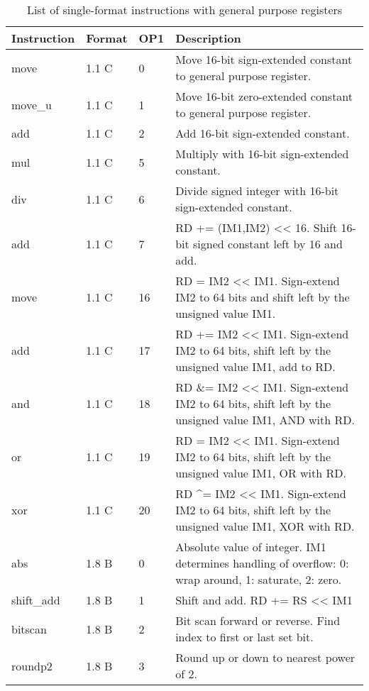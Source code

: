\documentclass[forwardcom.tex]{subfiles}
\begin{document}
\begin{longtable} {|p{25mm}|p{14mm}|p{10mm}|p{95mm}|}
\caption{List of single-format instructions with general purpose registers} 
\label{table:ListOfSingleFormatInstructionsGP} \\
\endfirsthead
\endhead
\hline
\bfseries Instruction & \bfseries Format &\bfseries OP1 & \bfseries Description \\
\hline
move          & 1.1 C &  0 & Move 16-bit sign-extended constant to general purpose register. \\
move\_u       & 1.1 C &  1 & Move 16-bit zero-extended constant to general purpose register. \\
add           & 1.1 C &  2  & Add 16-bit sign-extended constant. \\
mul           & 1.1 C &  5  & Multiply with 16-bit sign-extended constant. \\
div           & 1.1 C &  6  & Divide signed integer with 16-bit sign-extended constant. \\
add           & 1.1 C &  7  & RD += (IM1,IM2) \textless\textless{} 16. Shift 16-bit signed constant left by 16 and add. \\
move          & 1.1 C & 16  & RD = IM2 \textless\textless{} IM1. Sign-extend IM2 to 64 bits and shift left by the unsigned value IM1. \\
add           & 1.1 C & 17  & RD += IM2 \textless\textless{} IM1. Sign-extend IM2 to 64 bits, shift left by the unsigned value IM1, add to RD. \\
and           & 1.1 C & 18  & RD \&= IM2 \textless\textless{} IM1. Sign-extend IM2 to 64 bits, shift left by the unsigned value IM1, AND with RD. \\
or            & 1.1 C & 19  & RD \textbar{}= IM2 \textless\textless{} IM1. Sign-extend IM2 to 64 bits, shift left by the unsigned value IM1, OR with RD. \\
xor           & 1.1 C & 20  & RD \^{}= IM2 \textless\textless{} IM1. Sign-extend IM2 to 64 bits, shift left by the unsigned value IM1, XOR with RD. \\
abs           & 1.8 B &  0  & Absolute value of integer. IM1 determines handling of overflow: 0: wrap around, 1: saturate, 2: zero. \\
shift\_add    & 1.8 B &  1  & Shift and add. RD += RS \textless\textless{} IM1 \\
bitscan       & 1.8 B &  2 & Bit scan forward or reverse. Find index to first or last set bit. \\
roundp2       & 1.8 B &  3 & Round up or down to nearest power of 2. \\

\end{longtable}
\end{document}
